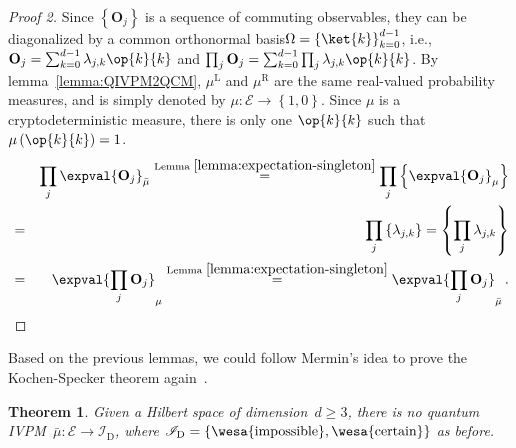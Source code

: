 \documentclass[12pt]{iopart}
\theoremstyle{plain}
\newtheorem{thm}{Theorem}
\theoremstyle{definition}
\theoremstyle{remark}
\newcommand{\events}{\ensuremath{\mathcal{E}}}
\newcommand{\imposs}{{\mbox{\wesa{impossible}}}}
\newcommand{\necess}{{\mbox{\wesa{certain}}}}
\newcommand{\proj}[1]{\op{#1}{#1}}
\newcommand{\mul}[1][]{\ensuremath{\mu^{\mathrm{L{#1}}}}}
\newcommand{\mur}[1][]{\ensuremath{\mu^{\mathrm{R{#1}}}}}
\newcommand{\nb}{\nolinebreak[3] }
\begin{document}
\begin{proof}[Proof 2]Since $\left\{ \mathbf{O}_{j}\right\} $ is
a sequence of commuting observables, they can be diagonalized by a
common orthonormal basis\nb$\Omega=\left\{ \ket{k}\right\} _{k=0}^{d-1}$,
i.e., $\mathbf{O}_{j}=\sum_{k=0}^{d-1}\lambda_{j,k}\proj{k}$ and
$\prod_{j}\mathbf{O}_{j}=\sum_{k=0}^{d-1}\prod_{j}\lambda_{j,k}\proj{k}$.
By lemma~\ref{lemma:QIVPM2QCM}, $\mul$ and $\mur$ are the same
real-valued probability measures, and is simply denoted by $\mu:\events\rightarrow\left\{ 1,0\right\} $.
Since $\mu$ is a cryptodeterministic measure, there is only one $\proj{k}$
such that $\mu\left(\proj{k}\right)=1$.
\begin{eqnarray*}
 &  & \prod_{j}\expval{\mathbf{O}_{j}}_{\bar{\mu}}\stackrel{\textrm{Lemma }\ref{lemma:expectation-singleton}}{=}\prod_{j}\left\{ \expval{\mathbf{O}_{j}}_{\mu}\right\} \\
 & = & \prod_{j}\left\{ \lambda_{j,k}\right\} =\left\{ \prod_{j}\lambda_{j,k}\right\} \\
 & = & \expval{\prod_{j}\mathbf{O}_{j}}_{\mu}\stackrel{\textrm{Lemma }\ref{lemma:expectation-singleton}}{=}\expval{\prod_{j}\mathbf{O}_{j}}_{\bar{\mu}}\,.
\end{eqnarray*}
\end{proof}

Based on the previous lemmas, we could follow Mermin's idea to prove
the Kochen-Specker theorem again~\cite{Mermin1990Simple,peres1995quantum}.

\begin{thm}\label{thm:Kochen-Specker-expectation}Given a Hilbert
space of dimension~$d\ge3$, there is no quantum IVPM~$\bar{\mu}:\events\rightarrow\mathscr{I}_{\mathrm{D}}$,
where $\mathscr{I}_{\mathrm{D}}=\left\{ \imposs,\necess\right\} $
as before.\end{thm}
\end{document}
